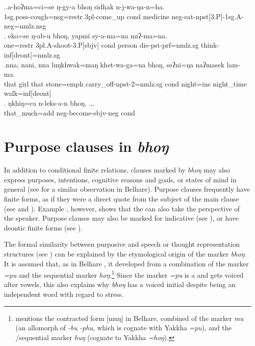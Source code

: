 \ex.\ag.\label{coughcond}a-hoʔma=ci=se ŋ-gy-a bhoŋ sidhak n-j-wa-ŋa-n=ha.\\
{\sc 1sg.poss-}cough{\sc =nsg=restr}  {\sc 3pl-}come\_up {\sc cond} medicine {\sc neg-}eat{\sc -npst[3.P]-1sg.A-neg=nmlz.nsg}\\
\bg. eko=se          ŋ-ab-u                  bhoŋ, yapmi  sy-a-ma=na                       miʔ-ma=na.\\
one{\sc =restr} {\sc 3pl.A-}shoot{\sc -3.P[sbjv]} {\sc cond} person die{\sc -pst-prf=nmlz.sg} think{\sc -inf[deont]=nmlz.sg}\\
 
\bg.nna,  nani,  nna  luŋkhwak=maŋ   khet-wa-ga=na                   bhoŋ, seʔni=ŋa       naʔmasek  lam-ma.\\
that girl that stone{\sc =emph} carry\_off{\sc -npst-2=nmlz.sg} {\sc cond} night{\sc =ins} night\_time walk{\sc =inf[deont]}\\
 
\bg. ŋkhiŋ=ca       n-leks-a-n         bhoŋ, ... \\
that\_much{\sc =add} {\sc neg-}become{\sc [3]-sbjv-neg} {\sc cond}\\
	
	
	

\section{Purpose clauses in \emph{bhoŋ}}\label{adv-cl-fin-purp}

In addition to conditional finite relations, clauses marked by \emph{bhoŋ} may also express purposes, intentions, cognitive reasons and goals, or states of mind in general (see \citealt{Bickel1993Belhare} for a similar observation in Belhare).  Purpose clauses frequently have  finite forms, as if they were a direct quote from the subject of the main clause (see \Next[a] and  \Next[b]). Example \Next[c], however, shows that the  can also take the perspective of the speaker. Purpose clauses may also be marked for indicative  (see \NNext[a]), or have deontic finite forms (see \NNext[b]). 

The formal similarity between purposive and speech or thought representation structures (see ) can be explained by the etymological origin of the marker \emph{bhoŋ}. It is assumed that, as in Belhare \citep{Bickel1993Belhare},  it developed from a combination of the   marker \emph{=pu} and the sequential marker \emph{hoŋ}.\footnote{\citet{Bickel1993Belhare} mentions the contracted form [muŋ] in Belhare, combined of the  marker \emph{mu} (an allomorph of \emph{-bu \ti -phu}, which is cognate with Yakkha \emph{=pu}), and the /sequential marker \emph{huŋ} (cognate to Yakkha \emph{=hoŋ}).}    Since the  marker \emph{=pu} is a  and gets voiced after vowels, this also explains why \emph{bhoŋ} has a voiced initial despite being an independent word with regard to stress.


